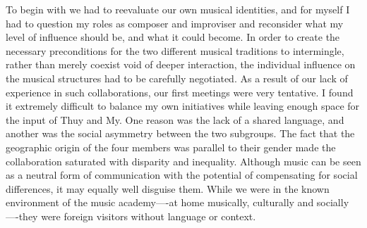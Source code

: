 \documentclass[a4paper]{article}
\begin{document}

To begin with we had to reevaluate our own musical identities, and for myself I had to question my roles as composer and improviser and reconsider what my level of influence should be, and what it could become. In order to create the necessary preconditions for the two different musical traditions to intermingle, rather than merely coexist void of deeper interaction, the individual influence on the musical structures had to be carefully negotiated. As a result of our lack of experience in such collaborations, our first meetings were very tentative. I found it extremely difficult to balance my own initiatives while leaving enough space for the input of Thuy and My. One reason was the lack of a shared language, and another was the social asymmetry between the two subgroups. The fact that the geographic origin of the four members was parallel to their gender made the collaboration saturated with disparity and inequality. Although music can be seen as a neutral form of communication with the potential of compensating for social differences, it may equally well disguise them. While we were in the known environment of the music academy—-at home musically, culturally and socially—-they were foreign visitors without language or context. 
\end{document}
